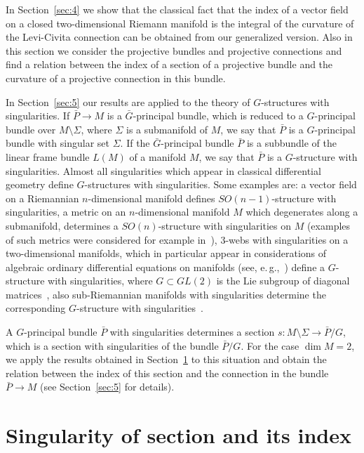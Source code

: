 \documentclass[12pt,letterpaper]{amsart}
\theoremstyle{definition}
\theoremstyle{plain}
\theoremstyle{remark}
\begin{document}
In Section~\ref{sec:4} we show that the classical fact that the index of a vector field on a closed two-dimensional Riemann manifold is the integral of the curvature of the Levi-Civita connection can be obtained from our generalized version.
Also in this section we consider the projective bundles and projective connections and find a relation between the index of a section of a projective bundle and the curvature of a projective connection in this bundle.

In Section~\ref{sec:5} our results are applied to the theory of $G$-structures with singularities.
If $\bar P \to M$ is a $\bar G$-principal bundle, which is reduced to a $G$-principal bundle over $M \setminus \Sigma$, where $\Sigma$ is a submanifold of $M$, we say that $\bar P$ is a $G$-principal bundle with singular set $\Sigma$.
If the $\bar G$-principal bundle $\bar P$ is a subbundle of the linear frame bundle $L(M)$ of a manifold $M$, we say that $\bar P$ is a $G$-structure with singularities.
Almost all singularities which appear in classical differential geometry define $G$-structures with singularities.
Some examples are: a vector field on a Riemannian $n$-dimensional manifold defines $SO(n-1)$-structure with singularities, a metric on an $n$-dimensional manifold $M$ which degenerates along a submanifold, determines a $SO(n)$-structure with singularities on $M$ (examples of such metrics were considered for example in~\cite{arteaga_malakhaltsev_trejos_2012}), $3$-webs with singularities on a two-dimensional manifolds, which in particular appear in considerations of algebraic ordinary differential equations on manifolds (see, e.\,g.,~\cite{agafonov2009}) define a $G$-structure with singularities, where $G \subset GL(2)$ is the Lie subgroup of diagonal matrices~\cite{arias_arteaga_malakhaltsev2015}, also sub-Riemannian manifolds with singularities determine the corresponding $G$-structure with singularities~\cite{arteaga_malakhaltsev2011}.

A $G$-principal bundle $\bar P$ with singularities determines a section $s : M \setminus \Sigma \to \bar P/G$, which is a section with singularities of the bundle $\bar P/G$.
For the case $\dim M = 2$, we apply the results obtained in Section~\ref{sec:2} to this situation and obtain the relation between the index of this section and the connection in the bundle $\bar P \to M$ (see Section~\ref{sec:5} for details).


\section{Singularity of section and its index}
\label{sec:2}
\end{document}
